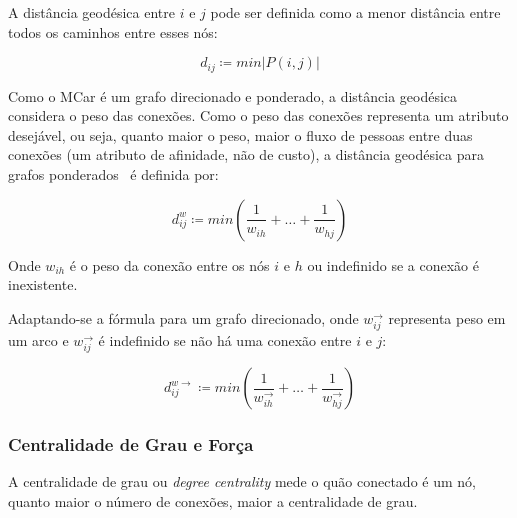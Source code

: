 \documentclass[12pt,a4paper]{article}
\theoremstyle{hypo}
\newcommand{\defn}{\coloneqq} %
\newcommand{\wout}{w^\rightarrow} %
\newcommand{\weighted}[1]{#1^w} %
\newcommand{\weighteddir}[1]{#1^{w\rightarrow}} %
\begin{document}
A distância geodésica entre $i$ e $j$ pode ser definida como a menor distância entre todos os caminhos entre esses nós:

\begin{equation} \label{eq:distancia-geodesica}
d_{ij} \defn min|P(i, j)| 
\end{equation}

Como o MCar é um grafo direcionado e ponderado, a distância geodésica considera o peso das conexões. Como o peso das conexões representa um atributo desejável, ou seja, quanto maior o peso, maior o fluxo de pessoas entre duas conexões (um atributo de afinidade, não de custo),  a distância geodésica para grafos ponderados~\cite{Newman2001-sl} é definida por:

\begin{equation} \label{eq:distancia-ponderada}
\weighted{d}_{ij} \defn min\left(\frac{1}{w_{ih}} + \ldots + \frac{1}{w_{hj}}\right)
\end{equation}

Onde $w_{ih}$ é o peso da conexão entre os nós $i$ e $h$ ou indefinido se a conexão é inexistente.

Adaptando-se a fórmula para um grafo direcionado, onde $\wout_{ij}$ representa peso em um arco e $\wout_{ij}$ é indefinido se não há uma conexão entre $i$ e $j$:

\begin{equation} \label{eq:distancia-ponderada-direcionada}
\weighteddir{d}_{ij} \defn min\left(\frac{1}{\wout_{ih}} + \ldots + \frac{1}{\wout_{hj}}\right)
\end{equation}

\subsubsection{Centralidade de Grau e Força} \label{sec:forca}

A centralidade de grau ou \textit{degree centrality} mede o quão conectado é um nó, quanto maior o número de conexões, maior a centralidade de grau.
\end{document}
